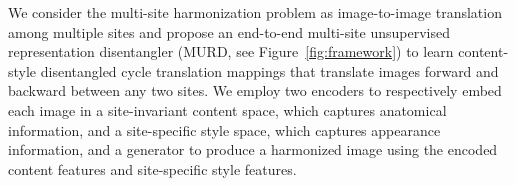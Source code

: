 \documentclass{nature}
\begin{document}
\begin{methods}
We consider the multi-site harmonization problem as image-to-image translation among multiple sites and propose an end-to-end multi-site unsupervised representation disentangler (MURD, see Figure~\ref{fig:framework}) to learn content-style disentangled cycle translation mappings that translate images forward and backward between any two sites. We employ two encoders to respectively embed each image in a site-invariant content space, which captures anatomical information, and a site-specific style space, which captures appearance information, and a generator to produce a harmonized image using the encoded content features and site-specific style features.




\end{methods}
\end{document}
